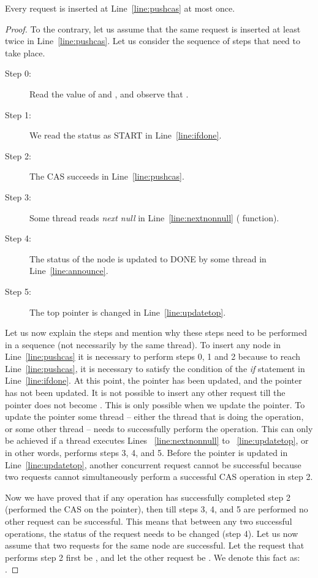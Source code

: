 \documentclass{llncs}
\newcommand{\START}{{\scriptsize{START}}\xspace}
\newcommand{\DONE}{{\scriptsize{DONE}}\xspace}
\begin{document}
\begin{appendix}
\begin{lemma}
Every  request is inserted at Line~\ref{line:pushcas} at most once.
\label{lemm:atmost}
\end{lemma}

\begin{proof}
To the contrary, let us assume that the same request is inserted at least twice in Line~\ref{line:pushcas}.
Let us consider the sequence of steps that need to take place. 
\begin{description}
\item [Step 0:] Read the value of  and , and observe that . 
\item [Step 1:] We read the status as \START in Line~\ref{line:ifdone}.
\item [Step 2:] The CAS succeeds in Line~\ref{line:pushcas}.
\item [Step 3:] Some thread reads {\em next  null} in Line~\ref{line:nextnonnull} ( function).
\item [Step 4:] The status of the node is updated to \DONE by some thread in Line~\ref{line:announce}.
\item [Step 5:] The top pointer is changed in Line~\ref{line:updatetop}.
\end{description}

Let us now explain the steps and mention why these steps need to be performed
in a sequence (not necessarily by the same thread). To insert any node in
Line~\ref{line:pushcas} it is necessary to perform steps 0, 1 and 2 because to
reach Line~\ref{line:pushcas}, it is necessary to satisfy the condition of the
{\em if} statement in Line~\ref{line:ifdone}.  At this point, the 
pointer has been updated, and the  pointer has not been updated.  It is
not possible to insert any other request till the  pointer does not
become . This is only possible when we update the  pointer. To
update the  pointer some thread -- either the thread that is doing the
 operation, or some other thread --  needs to successfully perform the
 operation. This can only be achieved if a thread executes Lines
~\ref{line:nextnonnull} to ~\ref{line:updatetop}, or in other words, performs steps 3, 4,
and 5. Before the  pointer is updated in Line~\ref{line:updatetop},
another concurrent  request cannot be successful because two 
requests cannot simultaneously perform a successful CAS operation in step 2.  

Now we have proved that if any  operation has successfully completed step
2 (performed the CAS on the  pointer), then till steps 3, 4, and 5 are
performed no other  request can be successful. This means that between
any two successful  operations, the status of the request needs to be
changed (step 4).  Let us now assume that two  requests for the same node
are successful. Let the request that performs step 2 first be , and let
the other request be . We denote this fact as: . 


\end{proof}
\end{appendix}
\end{document}
